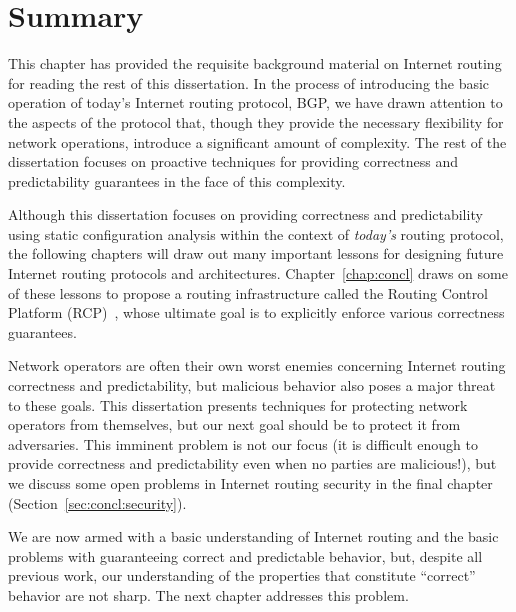 


\section{Summary}

This chapter has provided the requisite background material on Internet
routing for reading the rest of this dissertation.  In the process of
introducing the basic operation of today's Internet routing protocol,
BGP, we have drawn attention to the aspects of the protocol that, though
they provide the necessary flexibility for network operations, introduce
a significant amount of complexity.  The rest of the dissertation
focuses on proactive techniques for providing correctness and
predictability guarantees in the face of this complexity.

Although this dissertation focuses on providing correctness and
predictability using static configuration analysis within the context of
{\em today's} routing protocol, the following chapters will draw out many
important lessons for designing future Internet routing protocols and
architectures.  Chapter~\ref{chap:concl} draws on some of these lessons
to propose a routing infrastructure called the Routing Control Platform
(RCP)~\cite{caesar2004,feamster:fdna2004}, whose ultimate goal is to
explicitly enforce 
various correctness guarantees.  

Network operators are often their own worst enemies concerning Internet
routing correctness and predictability, but malicious behavior also
poses a major threat to these goals.  This dissertation presents
techniques for protecting network operators from themselves, but our
next goal should be to protect it from adversaries.  This imminent
problem is not our focus (it is difficult enough to provide correctness
and predictability even when no parties are malicious!), but we discuss
some open problems in Internet routing security in the final chapter
(Section~\ref{sec:concl:security}).

We are now armed with a basic understanding of Internet routing and the
basic problems with guaranteeing correct and predictable behavior, but,
despite all previous work, our understanding of the properties that
constitute ``correct'' behavior are not sharp.  The next chapter
addresses this problem.
